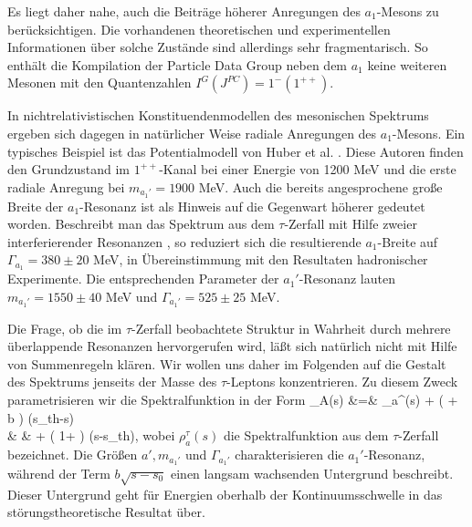 Es liegt daher nahe, auch die Beitr\"age h\"oherer Anregungen des 
$a_1$-Mesons zu ber\"ucksichtigen. Die vorhandenen theoretischen 
und experimentellen Informationen \"uber solche Zust\"ande sind 
allerdings sehr fragmentarisch. So enth\"alt die Kompilation der
Particle Data Group \cite{PDG90} neben dem $a_1$ keine weiteren 
Mesonen mit den Quantenzahlen $I^G(J^{PC})=1^-(1^{++})$.

In nichtrelativistischen Konstituendenmodellen des mesonischen 
Spektrums ergeben sich dagegen in nat\"urlicher Weise radiale
Anregungen des $a_1$-Mesons. Ein typisches Beispiel ist das
Potentialmodell von Huber et al. \cite{HMP  }. Diese Autoren 
finden den Grundzustand im $1^{++}$-Kanal bei einer Energie
von 1200 MeV und die erste radiale Anregung bei $m_{a_1'}=
1900$ MeV. Auch die bereits angesprochene gro\ss e Breite der
$a_1$-Resonanz ist als Hinweis auf die Gegenwart h\"oherer 
gedeutet worden. Beschreibt man das Spektrum aus dem $\tau$-Zerfall
mit Hilfe zweier interferierender Resonanzen \cite{IKM89},
so reduziert sich die resultierende $a_1$-Breite auf 
$\Gamma_{a_1}=380\pm 20$ MeV, in \"Ubereinstimmung mit den
Resultaten hadronischer Experimente.  Die entsprechenden 
Parameter der $a_1'$-Resonanz lauten $m_{a_1'}=1550\pm 40$ MeV
und $\Gamma_{a_1'}=525\pm 25$ MeV.

Die Frage, ob die im $\tau$-Zerfall beobachtete Struktur in 
Wahrheit durch mehrere \"uberlappende Resonanzen hervorgerufen
wird, l\"a\ss t sich nat\"urlich nicht mit Hilfe von Summenregeln    
kl\"aren. Wir wollen uns daher im Folgenden auf die Gestalt des 
Spektrums jenseits der Masse des $\tau$-Leptons konzentrieren. 
Zu diesem Zweck parametrisieren wir die Spektralfunktion 
in der Form
\beq
\label{rhoap}
  \rho_A(s) &=& \rho_a^\tau (s) + \Big( 
    + b \Big)
   \Theta (s_{th}-s)  \nonumber \\[0.1cm]
   & &  \hspace{1.3cm} \mbox{}+ 
   \Big( 1+ \Big) \Theta (s-s_{th}),
\eeq
wobei $\rho_a^\tau (s)$ die Spektralfunktion aus dem $\tau$-Zerfall 
bezeichnet. Die Gr\"o\ss en $a',m_{a_1'}$ und $\Gamma_{a_1'}$ 
charakterisieren die $a_1'$-Resonanz, w\"ahrend der Term 
$b\sqrt{s-s_0}$ einen langsam wachsenden Untergrund beschreibt. 
Dieser Untergrund geht f\"ur Energien oberhalb der 
Kontinuumsschwelle in das st\"orungstheoretische Resultat 
\"uber.

